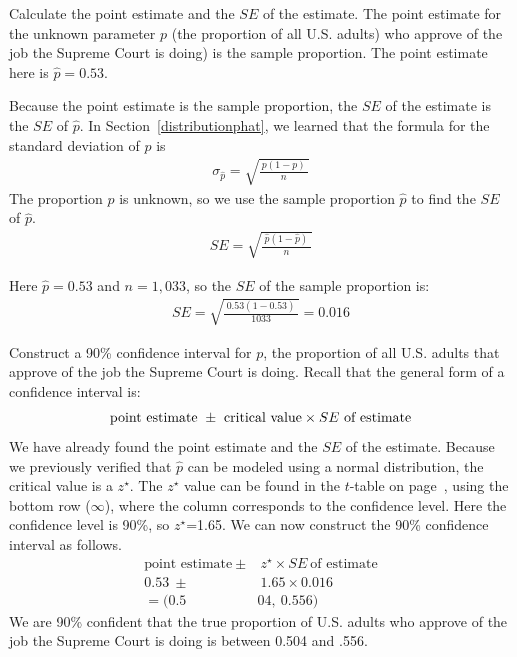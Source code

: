 \begin{examplewrap}
\begin{nexample}{Calculate the point estimate and the $SE$ of the estimate.}
\label{supremeCourtCISEExample}
The point estimate for the unknown parameter $p$ (the proportion of all U.S. adults) who approve of the job the Supreme Court is doing) is the sample proportion. The point estimate here is $\hat{p} = 0.53$.

Because the point estimate is the sample proportion, the $SE$ of the estimate is the $SE$ of $\hat{p}$.  
In Section~\ref{distributionphat}, we learned that the formula for the standard deviation of $\hat{p}$ is
\begin{align*}
\sigma_{\hat{p}} = \sqrt{\frac{\ p(1-p)\ }{n}}
\end{align*}
The proportion $p$ is unknown, so we use the sample proportion $\hat{p}$ to find the $SE$ of $\hat{p}$.  
\begin{align*}
SE = \sqrt{\frac{\ \hat{p}(1-\hat{p})\ }{n}}
\end{align*}

Here $\hat{p}=0.53$ and $n=1,033$, so the $SE$ of the sample proportion is:
\begin{align*}
SE = \sqrt{\frac{\ 0.53(1-0.53)\ }{1033}}=0.016
\end{align*}
\end{nexample}
\end{examplewrap}


\begin{examplewrap}
\begin{nexample}{Construct a 90\% confidence interval for $p$, the proportion of all U.S. adults that approve of the job the Supreme Court is doing.}
\label{90CIForJobSupremeCourtDoingExample}
Recall that the general form of a confidence interval is:
\begin{align*}
\text{point estimate}\ \pm\ \text{critical value} \times SE\ \text{of estimate}\vspace{-2mm}
\end{align*}
We have already found the point estimate and the $SE$ of the estimate.  Because we previously verified that $\hat{p}$ can be modeled using a normal distribution, the critical value is a $z^{\star}$.  The $z^{\star}$ value can be found in the $t$-table on page~\pageref{tDistributionTable}, using the bottom row ($\infty$), where the column corresponds to the confidence level.  Here the confidence level is 90\%, so  $z^{\star}$=1.65.  We can now construct the 90\% confidence interval as follows.  
\begin{align*}
\text{point estimate}\ \pm&\  z^{\star} \times SE\ \text{of estimate} \\
0.53\ \pm&\  1.65 \times 0.016 \\
= (0.5&04,\ 0.556)
\end{align*}
We are 90\% confident that the true proportion of U.S. adults who approve of the job the Supreme Court is doing is between 0.504 and .556. 
\end{nexample}
\end{examplewrap}


